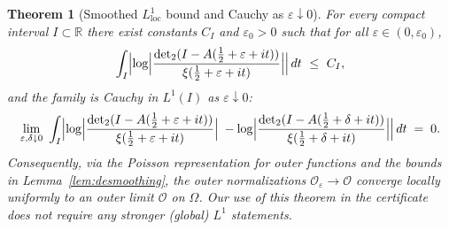 \documentclass[11pt]{article}
\newtheorem{theorem}{Theorem}
\theoremstyle{definition}
\theoremstyle{remark}
\newcommand{\R}{\mathbb{R}}
\DeclareMathOperator{\dettwo}{det_2}
\begin{document}
\begin{theorem}[Smoothed $L^1_{\mathrm{loc}}$ bound and Cauchy as \(\varepsilon\downarrow 0\)]\label{thm:uniform-eps}
For every compact interval $I\subset\R$ there exist constants $C_I$ and \(\varepsilon_0>0\) such that for all \(\varepsilon\in(0,\varepsilon_0)\),
\[
 \int_I \Bigl|\log\Bigl|\frac{\dettwo(I-A(\tfrac12+\varepsilon+it))}{\xi(\tfrac12+\varepsilon+it)}\Bigr|\Bigr|\,dt\ \le\ C_I,
\]
and the family is Cauchy in $L^1(I)$ as \(\varepsilon\downarrow 0\):
\[
 \lim_{\substack{\varepsilon,\delta\downarrow 0}}\ \int_I \Bigl|\log\Bigl|\frac{\dettwo(I-A(\tfrac12+\varepsilon+it))}{\xi(\tfrac12+\varepsilon+it)}\Bigr|\;-
 \log\Bigl|\frac{\dettwo(I-A(\tfrac12+\delta+it))}{\xi(\tfrac12+\delta+it)}\Bigr|\Bigr|\,dt\;=\;0.
\]
Consequently, via the Poisson representation for outer functions and the bounds in Lemma~\ref{lem:desmoothing}, the outer normalizations \(\mathcal O_{\varepsilon}\to \mathcal O\) converge locally uniformly to an outer limit \(\mathcal O\) on \(\Omega\). Our use of this theorem in the certificate does not require any stronger (global) $L^1$ statements.
\end{theorem}
\end{document}
